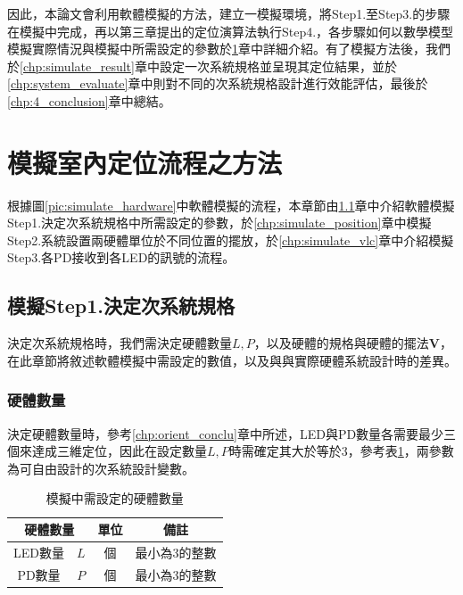 因此，本論文會利用軟體模擬的方法，建立一模擬環境，將Step1.至Step3.的步驟在模擬中完成，再以第三章提出的定位演算法執行Step4.，各步驟如何以數學模型模擬實際情況與模擬中所需設定的參數於\ref{chp:simulation}章中詳細介紹。有了模擬方法後，我們於\ref{chp:simulate_result}章中設定一次系統規格並呈現其定位結果，並於\ref{chp:system_evaluate}章中則對不同的次系統規格設計進行效能評估，最後於\ref{chp:4_conclusion}章中總結。


\section{模擬室內定位流程之方法}
\label{chp:simulation}

根據圖\ref{pic:simulate_hardware}中軟體模擬的流程，本章節由\ref{chp:system_design}章中介紹軟體模擬Step1.決定次系統規格中所需設定的參數，於\ref{chp:simulate_position}章中模擬Step2.系統設置兩硬體單位於不同位置的擺放，於\ref{chp:simulate_vlc}章中介紹模擬Step3.各PD接收到各LED的訊號的流程。




\subsection{模擬Step1.決定次系統規格}
\label{chp:system_design}

決定次系統規格時，我們需決定硬體數量$L,P$，以及硬體的規格與硬體的擺法$\boldsymbol{V}$，在此章節將敘述軟體模擬中需設定的數值，以及與與實際硬體系統設計時的差異。

\subsubsection{硬體數量}

決定硬體數量時，參考\ref{chp:orient_conclu}章中所述，LED與PD數量各需要最少三個來達成三維定位，因此在設定數量$L,P$時需確定其大於等於3，參考表\ref{tab:para_amount}，兩參數為可自由設計的次系統設計變數。

\begin{table}[htpb]
    \renewcommand{\arraystretch}{1.3}
    \setlength{\arrayrulewidth}{0.15mm}
    \setlength{\doublerulesep}{0.12mm}
    \caption{模擬中需設定的硬體數量}
    \label{tab:para_amount}
    \centering
    \begin{tabular}{|cc|c|c|}
    \hline
    \multicolumn{2}{|c|}{\textbf{硬體數量}}  &\textbf{單位}  &  \textbf{備註}   \\
    \hline
     LED數量 &$L$ & 個 & 最小為3的整數 \\\hline
      PD數量& $P$& 個  & 最小為3的整數 \\\hline
    \end{tabular}
\end{table}
    
